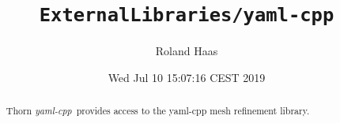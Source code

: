 \documentclass{article}
\begin{document}
\title{\tt ExternalLibraries/yaml-cpp}
\author{Roland Haas}
\date{ Wed Jul 10 15:07:16 CEST 2019 }

\maketitle


\ifx\ThisThorn\undefined
\newcommand{\ThisThorn}{{\it yaml-cpp}}
\else
\renewcommand{\ThisThorn}{{\it yaml-cpp}}
\fi

\begin{abstract}
Thorn \ThisThorn\ provides access to the yaml-cpp mesh refinement library.
\end{abstract}

\end{document}
